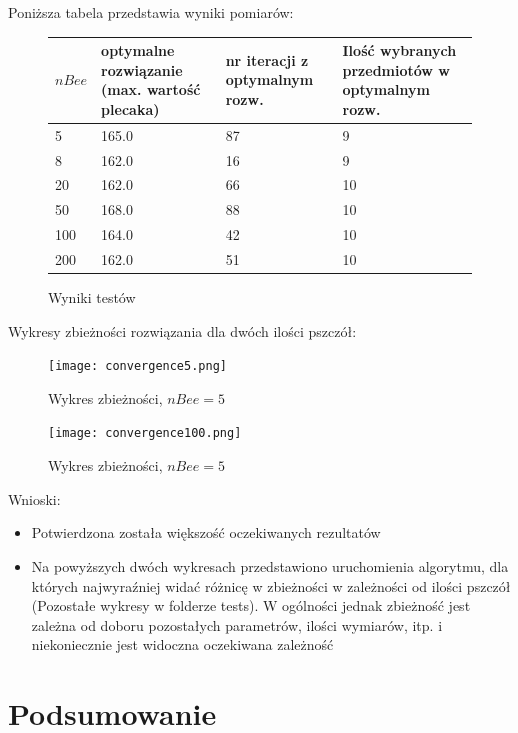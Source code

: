 \documentclass[a4paper,12pt,notitlepage]{mwrep}
\begin{document}
Poniższa tabela przedstawia wyniki pomiarów:

\begin{figure}[H]
\begin{center}
	\begin{tabular}{ | p{1.5cm} | p{3.5cm} | p{3.5cm} | p{3.5cm} |} \hline
	$nBee$ & optymalne rozwiązanie (max. wartość plecaka) & nr iteracji z optymalnym rozw. & Ilość wybranych przedmiotów w optymalnym rozw. \\\hline\hline
	5	&	165.0	&	87	&	9 \\\hline
	8	&	162.0	&	16	&	9 \\\hline
	20	&	162.0	&	66	&	10 \\\hline
	50	&	168.0	&	88	&	10 \\\hline
	100	&	164.0	&	42	&	10 \\\hline
	200	&	162.0	&	51	&	10 \\\hline
	\end{tabular}
\end{center}
\caption{Wyniki testów}
\label{fig:testres}
\end{figure}

Wykresy zbieżności rozwiązania dla dwóch ilości pszczół:
\begin{figure}[h]
\centering
\texttt{[image: convergence5.png]}
\caption{Wykres zbieżności, $nBee = 5$}
\label{fig:chart100}
\end{figure}

\begin{figure}[H]
\centering
\texttt{[image: convergence100.png]}
\caption{Wykres zbieżności, $nBee = 5$}
\label{fig:chart100}
\end{figure}

\noindent
Wnioski:
\begin{itemize}
	\item	Potwierdzona została większość oczekiwanych rezultatów
	\item	Na powyższych dwóch wykresach przedstawiono uruchomienia algorytmu, dla których
			najwyraźniej widać różnicę w zbieżności w zależności od ilości pszczół
			(Pozostałe wykresy w folderze tests).
			W ogólności jednak zbieżność jest zależna od doboru pozostałych parametrów,
			ilości wymiarów, itp. i niekoniecznie jest widoczna oczekiwana zależność
\end{itemize}

\chapter{Podsumowanie}
\end{document}
